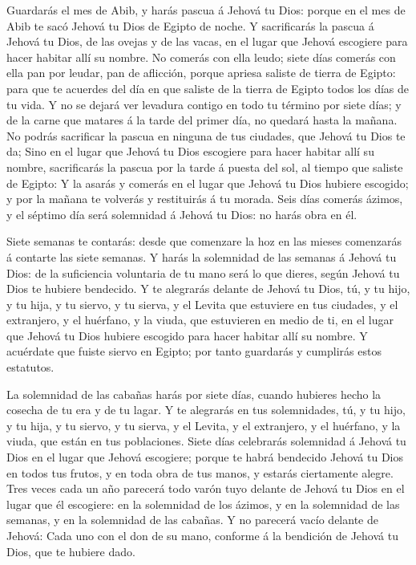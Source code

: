  Guardarás el mes de Abib, y harás pascua á Jehová tu Dios:
porque en el mes de Abib te sacó Jehová tu Dios de Egipto de noche.
 Y sacrificarás la pascua á Jehová tu Dios, de las ovejas y
de las vacas, en el lugar que Jehová escogiere para hacer habitar allí
su nombre.  No comerás con ella leudo; siete días comerás
con ella pan por leudar, pan de aflicción, porque apriesa saliste de
tierra de Egipto: para que te acuerdes del día en que saliste de la
tierra de Egipto todos los días de tu vida.  Y no se dejará
ver levadura contigo en todo tu término por siete días; y de la carne
que matares á la tarde del primer día, no quedará hasta la mañana.
 No podrás sacrificar la pascua en ninguna de tus ciudades,
que Jehová tu Dios te da;  Sino en el lugar que Jehová tu
Dios escogiere para hacer habitar allí su nombre, sacrificarás la pascua
por la tarde á puesta del sol, al tiempo que saliste de Egipto:
 Y la asarás y comerás en el lugar que Jehová tu Dios
hubiere escogido; y por la mañana te volverás y restituirás á tu morada.
 Seis días comerás ázimos, y el séptimo día será solemnidad
á Jehová tu Dios: no harás obra en él.

 Siete semanas te contarás: desde que comenzare la hoz en
las mieses comenzarás á contarte las siete semanas.  Y
harás la solemnidad de las semanas á Jehová tu Dios: de la suficiencia
voluntaria de tu mano será lo que dieres, según Jehová tu Dios te
hubiere bendecido.  Y te alegrarás delante de Jehová tu
Dios, tú, y tu hijo, y tu hija, y tu siervo, y tu sierva, y el Levita
que estuviere en tus ciudades, y el extranjero, y el huérfano, y la
viuda, que estuvieren en medio de ti, en el lugar que Jehová tu Dios
hubiere escogido para hacer habitar allí su nombre.  Y
acuérdate que fuiste siervo en Egipto; por tanto guardarás y cumplirás
estos estatutos.

 La solemnidad de las cabañas harás por siete días, cuando
hubieres hecho la cosecha de tu era y de tu lagar.  Y te
alegrarás en tus solemnidades, tú, y tu hijo, y tu hija, y tu siervo, y
tu sierva, y el Levita, y el extranjero, y el huérfano, y la viuda, que
están en tus poblaciones.  Siete días celebrarás solemnidad
á Jehová tu Dios en el lugar que Jehová escogiere; porque te habrá
bendecido Jehová tu Dios en todos tus frutos, y en toda obra de tus
manos, y estarás ciertamente alegre.  Tres veces cada un
año parecerá todo varón tuyo delante de Jehová tu Dios en el lugar que
él escogiere: en la solemnidad de los ázimos, y en la solemnidad de las
semanas, y en la solemnidad de las cabañas. Y no parecerá vacío delante
de Jehová:  Cada uno con el don de su mano, conforme á la
bendición de Jehová tu Dios, que te hubiere dado.

